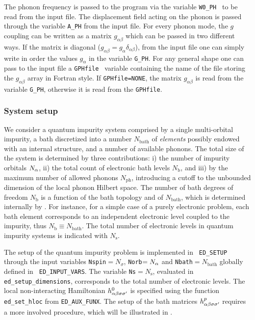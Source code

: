 \documentclass[edipack_sp.tex]{subfiles}
\begin{document}
The phonon frequency is passed to the \NAME program via the variable { \tt W0\_PH } to be read from the input file. The displacement field acting on the phonon is passed through the variable {\tt A\_PH} from the input file. For every phonon mode, the $g$ coupling can be written as a matrix $g_{\alpha \beta}$ which can be passed in two different ways. If the matrix is diagonal ($g_{\alpha \beta} = g_\alpha \delta_{\alpha \beta}$), from the input file one can simply write in order the values $g_\alpha$ in the variable {\tt G\_PH}. For any general shape one can pass to the input file a {\tt GPHfile } variable containing the name of the file storing the $g_{\alpha \beta}$ array in Fortran style.
If {\tt GPHfile=NONE}, the matrix $g_{\alpha\beta}$ is read from the variable {\tt G\_PH}, otherwise it is read from the {\tt GPHfile}.

\subsubsection{System setup}
We consider a quantum impurity system comprised by a single multi-orbital impurity, a bath discretized into a number $N_\mathrm{bath}$ of {\it elements} possibly endowed with an internal structure, and a number of available phonons. 
The total size of the system is determined by three contributions: i) the number of impurity orbitals $N_\alpha$, ii) the total count of electronic bath levels $N_\mathrm{b}$, and iii) by the maximum  number of allowed phonons $N_\mathrm{ph}$, introducing a cutoff to the unbounded dimension of the local phonon Hilbert space.
The number of bath degrees of freedom $N_\mathrm{b}$ is a
function of the bath topology and of $N_\mathrm{bath}$, which is determined internally by \NAME.
For instance, for a simple case of a purely electronic problem, each bath
element corresponds to an independent electronic level coupled to the
impurity, thus $N_\mathrm{b}\equiv N_\mathrm{bath}$. 
The total number of electronic levels in quantum impurity systems is indicated with $N_\mathrm{s}$.


The setup of the quantum impurity problem is implemented in {\tt
  ED\_SETUP} through the input variables {\tt Nspin}$=N_\sigma$,
{\tt Norb}$=N_\alpha$ and {\tt Nbath}$=N_\mathrm{bath}$ globally defined in {\tt
  ED\_INPUT\_VARS}. The variable {\tt Ns}$=N_\mathrm{s}$, evaluated in
{\tt ed\_setup\_dimensions}, corresponds to the total number of
electronic levels. 
The local non-interacting Hamiltonian
$h^0_{\alpha\beta\sigma\sigma'}$ is specified using the function {\tt ed\_set\_hloc} from {\tt ED\_AUX\_FUNX}.
The setup of the bath matrices $h^p_{\alpha\beta\sigma\sigma'}$
requires a more involved procedure, which will be illustrated in
. 
\end{document}
